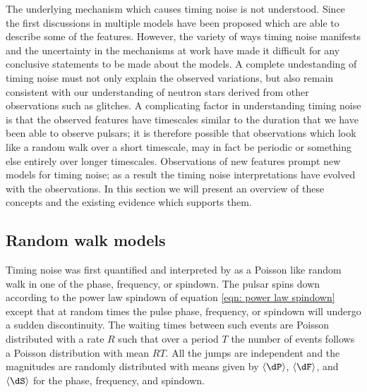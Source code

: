 The underlying mechanism which causes timing noise is not understood. Since the
first discussions in \citet{Boynton1972} multiple models have been proposed
which are able to describe some of the features. However, the variety of ways
timing noise manifests and the uncertainty in the mechanisms at work have made
it difficult for any conclusive statements to be made about the models. A
complete undestanding of timing noise must not only explain the observed
variations, but also remain consistent with our understanding of neutron stars
derived from other observations such as glitches. A complicating factor in
understanding timing noise is that the observed features have timescales
similar to the duration that we have been able to observe pulsars; it is
therefore possible that observations which look like a random walk over a short
timescale, may in fact be periodic or something else entirely over longer
timescales.  Observations of new features prompt new models for timing noise;
as a result the timing noise interpretations have evolved with the
observations. In this section we will present an overview of these concepts and
the existing evidence which supports them.

\subsection{Random walk models}
\label{sec: TN interpretations random walk models}

Timing noise was first quantified and interpreted by \citet{Boynton1972} as a
Poisson like random walk in one of the phase, frequency, or spindown. The
pulsar spins down according to the power law spindown of equation \eqref{eqn:
power law spindown} except that at random times the pulse phase, frequency, or
spindown will undergo a sudden discontinuity. The waiting times between such events
are Poisson distributed with a rate $R$ such that over a period $T$ the number of
events follows a Poisson distribution with mean $RT$. All the jumps are
independent and the magnitudes are randomly distributed with means given by
$\langle\dP\rangle$, $\langle\dF\rangle$, and $\langle\dS\rangle$ for the phase,
frequency, and spindown.

